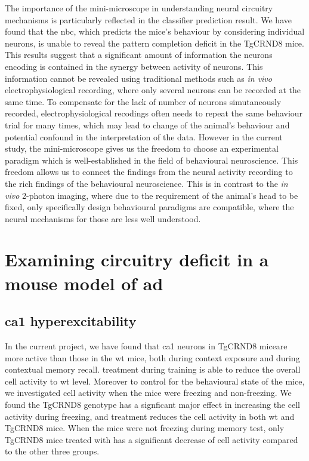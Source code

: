 The importance of the mini-microscope in understanding neural circuitry mechanisms is particularly reflected in the classifier prediction result. We have found that the \gls{nbc}, which predicts the mice's behaviour by considering individual neurons, is unable to reveal the pattern completion deficit in the TgCRND8 mice. This results suggest that a significant amount of information the neurons encoding is contained in the synergy between activity of neurons. This information cannot be revealed using traditional methods such as \textit{in vivo} electrophysiological recording, where only several neurons can be recorded at the same time. To compensate for the lack of number of neurons simutaneously recorded, electrophysiological recodings often needs to repeat the same behaviour trial for many times, which may lead to change of the animal's behaviour and potential confound in the interpretation of the data. However in the current study, the mini-microscope gives us the freedom to choose an experimental paradigm which is well-established in the field of behavioural neuroscience. This freedom allows us to connect the findings from the neural activity recording to the rich findings of the behavioural neuroscience. This is in contrast to the \textit{in vivo} 2-photon imaging, where due to the requirement of the animal's head to be fixed, only specifically design behavioural paradigms are compatible, where the neural mechanisms for those are less well understood. 


\section{Examining circuitry deficit in a mouse model of \gls{ad}}

\subsection{\gls{ca1} hyperexcitability}
In the current project, we have found that \gls{ca1} neurons in TgCRND8 miceare more active than those in the \gls{wt} mice, both during context exposure and during contextual memory recall. \tglu{} treatment during training is able to reduce the overall cell activity to \gls{wt} level. Moreover to control for the behavioural state of the mice, we investigated cell activity when the mice were freezing and non-freezing. We found the TgCRND8 genotype has a signficant major effect in increasing the cell activity during freezing, and \tglu treatment reduces the cell activity in both \gls{wt} and TgCRND8 mice. When the mice were not freezing during memory test, only TgCRND8 mice treated with \tglu has a significant decrease of cell activity compared to the other three groups. 

